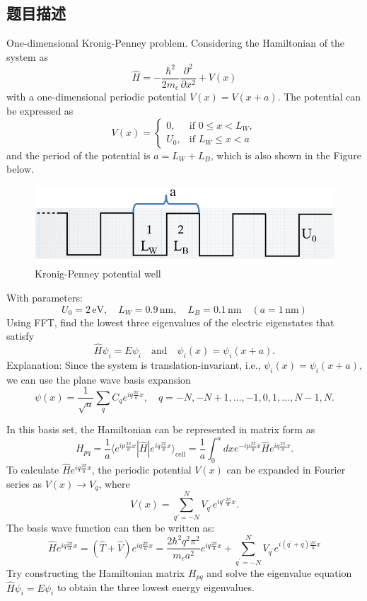 \subsection{题目描述}
\noindent One-dimensional Kronig-Penney problem. Considering the Hamiltonian of the system as 
\[
\hat{H} = -\frac{\hbar^2}{2 m_e} \frac{\partial^2}{\partial x^2} + V(x)
\]
with a one-dimensional periodic potential \( V(x) = V(x + a) \). The potential can be expressed as 
\[
V(x) = 
\begin{cases}
0, & \text{if } 0  \leq x < L_W, \\
U_0, & \text{if } L_W \leq x < a
\end{cases}
\]
and the period of the potential is $a = L_W+L_B$, which is also shown in the Figure below.

\begin{figure}[H]
    \centering
    \includegraphics[width=1.0\textwidth]{Problem_1/figs/potential_well.png}
    \caption{Kronig-Penney potential well}
\end{figure}
\noindent With parameters:
\[
U_0 = 2 \, \text{eV}, \quad L_W = 0.9 \, \text{nm}, \quad L_B = 0.1 \, \text{nm} \quad (a = 1 \, \text{nm})
\]
Using FFT, find the lowest three eigenvalues of the electric eigenstates that satisfy 
\[
\hat{H} \psi_i = E \psi_i \quad \text{and} \quad \psi_i(x) = \psi_i(x + a).
\]
Explanation: Since the system is translation-invariant, i.e., \( \psi_i(x) = \psi_i(x + a) \), we can use the plane wave basis expansion 
$$ \psi(x) = \frac{1}{\sqrt{a}} \sum_q C_q e^{i q \frac{2\pi}{a} x} ,\quad q = -N, -N + 1, \dots, -1, 0, 1, \dots, N - 1, N .$$

\noindent In this basis set, the Hamiltonian can be represented in matrix form as
\[H_{pq}=\frac{1}{a}\langle e^{ip\frac{2\pi}{a}x}|\hat{H}|e^{iq\frac{2\pi}{a}x}\rangle_{\mathrm{cell}}=\frac{1}{a}\int_{0}^{a}dx e^{-ip\frac{2\pi}{a}x}\hat{H}e^{iq\frac{2\pi}{a}x}.\]
To calculate \( \hat{H} e^{i q \frac{2\pi}{a} x} \), the periodic potential \( V(x) \) can be expanded in Fourier series as \( V(x) \rightarrow V_q \), where 
\[ V(x) = \sum_{q'=-N}^{N} V_{q'} e^{i q' \frac{2\pi}{a} x} .\]
The basis wave function can then be written as:
\[\hat{H}e^{iq\frac{2\pi}{a}x}=(\hat{T}+\hat{V})e^{iq\frac{2\pi}{a}x}=\frac{2\hbar^2q^2\pi^2}{m_e a^2}e^{iq\frac{2\pi}{a}x}+\sum_{q^{\prime}=-N}^NV_{q^{\prime}}e^{i(q^{\prime}+q)\frac{2\pi}{a}x}\]
Try constructing the Hamiltonian matrix \( H_{pq} \) and solve the eigenvalue equation \( \hat{H} \psi_i = E \psi_i \) to obtain the three lowest energy eigenvalues.

